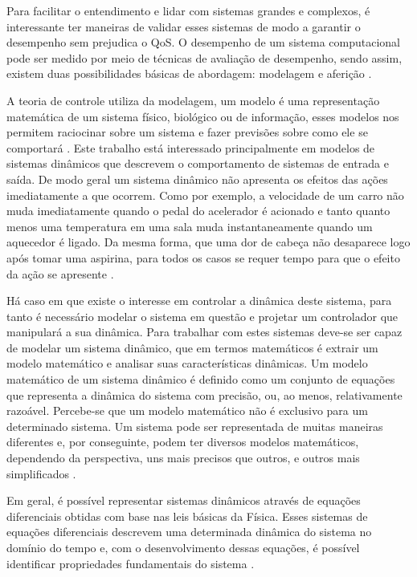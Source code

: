 Para facilitar o entendimento e lidar com sistemas grandes e complexos, é interessante ter maneiras de validar esses sistemas de modo a garantir o desempenho sem prejudica o QoS. O desempenho de um sistema computacional pode ser medido por meio de técnicas de avaliação de desempenho, sendo assim, existem duas possibilidades básicas de abordagem: modelagem e aferição \cite{Jain1991}.

A teoria de controle utiliza da modelagem, um modelo é uma representação matemática de um sistema físico, biológico ou de informação, esses modelos nos permitem raciocinar sobre um sistema e fazer previsões sobre como ele se comportará \cite{Karl2008}. Este trabalho está interessado principalmente em modelos de sistemas dinâmicos que descrevem o comportamento de sistemas de entrada e saída. De modo geral um sistema dinâmico não apresenta os efeitos das ações imediatamente a que ocorrem. Como por exemplo, a velocidade de um carro não muda imediatamente quando o pedal do acelerador é acionado e tanto quanto menos uma temperatura em uma sala muda instantaneamente quando um aquecedor é ligado. Da mesma forma, que uma dor de cabeça não desaparece logo após tomar uma aspirina, para todos os casos se requer tempo para que o efeito da ação se apresente \cite{Karl2008}.

Há caso em que existe o interesse em controlar a dinâmica deste sistema, para tanto é necessário modelar o sistema em questão e projetar um controlador que manipulará a sua dinâmica. Para trabalhar com estes sistemas deve-se ser capaz de modelar um sistema dinâmico, que em termos matemáticos é extrair um modelo matemático e analisar suas características dinâmicas. Um modelo matemático de um sistema dinâmico é definido como um conjunto de equações que representa a dinâmica do sistema com precisão, ou, ao menos, relativamente razoável. Percebe-se que um modelo matemático não é exclusivo para um determinado sistema. Um sistema pode ser representada de muitas maneiras diferentes e, por conseguinte, podem ter diversos modelos matemáticos, dependendo da perspectiva, uns mais precisos que outros, e outros mais simplificados \cite{Ogata2001}.

Em geral, é possível representar sistemas dinâmicos através de equações diferenciais obtidas com base nas leis básicas da Física. Esses sistemas de equações diferenciais descrevem uma determinada dinâmica do sistema no domínio do tempo e, com o desenvolvimento dessas equações, é possível identificar propriedades fundamentais do sistema \cite{Nobile2013}.


